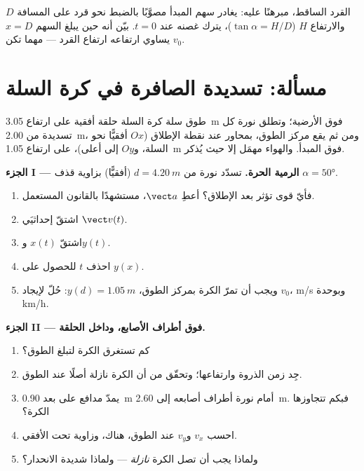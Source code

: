 \begin{exercise}[$\star\star\star$]\label{exo:g12:projectile-motion:15}
القرد الساقط، مبرهنًا عليه: يغادر سهم المبدأ مصوَّبًا بالضبط نحو
قرد على المسافة $D$ والارتفاع $H$ ($\tan\alpha = H/D$)، يترك غصنه عند
$t = 0$. بيّن أنه حين يبلغ السهم $x = D$ يساوي ارتفاعه ارتفاع
القرد --- مهما تكن $v_0$.
\end{exercise}

\section{مسألة: تسديدة الصافرة في كرة السلة}

\begin{problem}
\label{pb:g12:projectile-motion:1}
طوق سلة كرة السلة حلقة أفقية على ارتفاع \qty{3.05}{m} فوق
الأرضية؛ وتطلق نورة كل تسديدة من \qty{2.00}{m}، ومن ثم يقع مركز الطوق،
بمحاور عند نقطة الإطلاق ($Ox$ أفقيًّا نحو السلة، و$Oy$ إلى أعلى)،
على ارتفاع \qty{1.05}{m} فوق المبدأ. والهواء مهمَل إلا حيث يُذكر.

\medskip\noindent\textbf{الجزء I --- الرمية الحرة.} تسدّد نورة من
$d = \qty{4.20}{m}$ (أفقيًّا) بزاوية قذف $\alpha = \ang{50}$.
\begin{enumerate}
  \item فأيّ قوى تؤثر بعد الإطلاق؟ أعطِ $\vect a$، مستشهدًا بالقانون المستعمل.
  \item اشتقّ إحداثيَي $\vect v(t)$.
  \item اشتقّ $x(t)$ و$y(t)$.
  \item احذف $t$ للحصول على  $y(x)$.
  \item ويجب أن تمرّ الكرة بمركز الطوق، $y(d) = \qty{1.05}{m}$: حُلّ
        لإيجاد $v_0$،  \unit{m/s} وبوحدة \unit{km/h}.
\end{enumerate}

\medskip\noindent\textbf{الجزء II --- فوق أطراف الأصابع، وداخل الحلقة.}
\begin{enumerate}[resume]
  \item كم تستغرق الكرة لتبلغ الطوق؟
  \item جِد زمن الذروة وارتفاعها؛ وتحقّق من أن الكرة نازلة أصلًا
        عند الطوق.
  \item يمدّ مدافع على بعد \qty{0.90}{m} أمام نورة أطراف أصابعه إلى
        \qty{2.60}{m}. فبكم تتجاوزها الكرة؟
  \item احسب $v_x$ و$v_y$ عند الطوق،  هناك، وزاوية
         تحت الأفقي.
  \item ولماذا يجب أن تصل الكرة \emph{نازلة} --- ولماذا شديدة الانحدار؟
\end{enumerate}


\end{problem}
